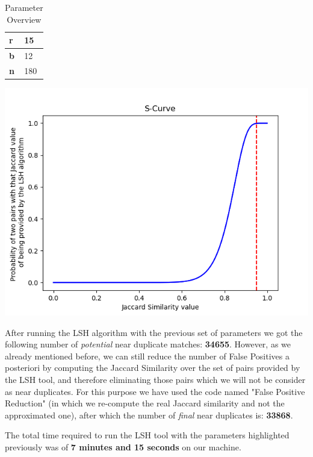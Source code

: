 \documentclass[10pt]{article}
\begin{document}
\begin{table}[H]
\centering
\begin{tabular}{|l|l|}
\hline
\textbf{r} & 15    \\ \hline
\textbf{b} & 12   \\ \hline
\textbf{n} & 180 \\ \hline
\end{tabular}
\caption{Parameter Overview}
\label{tab:my-table}
\end{table}

\begin{center}
\includegraphics[scale=.70]{Splot.png}
\end{center}

After running the LSH algorithm with the previous set of parameters we got the following number of \textit{potential} near duplicate matches: \textbf{34655}. However, as we already mentioned before, we can still reduce the number of False Positives a posteriori by computing the Jaccard Similarity over the set of pairs provided by the LSH tool, and therefore eliminating those pairs which we will not be consider as near duplicates. For this purpose we have used the code named "False Positive Reduction" (in which we re-compute the real Jaccard similarity and not the approximated one), after which the number of \textit{final} near duplicates is: \textbf{33868}.

The total time required to run the LSH tool with the parameters highlighted previously was of \textbf{7 minutes and 15 seconds} on our machine.
\end{document}
